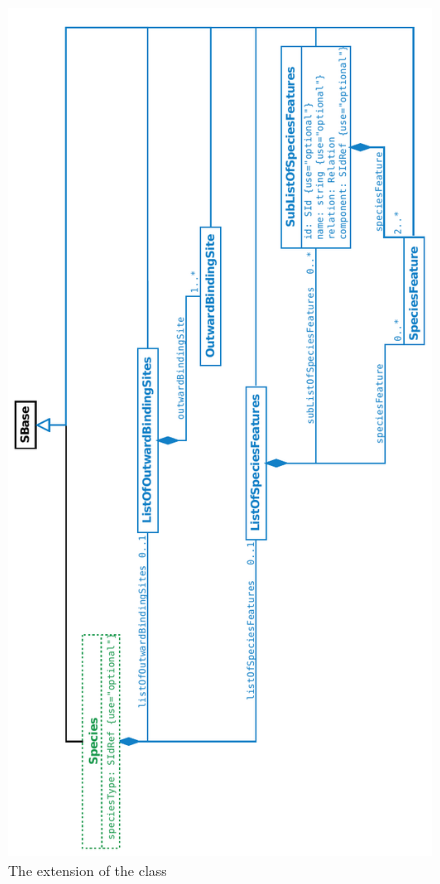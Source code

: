 \begin{figure}[htb]
  \begin{center}
    \includegraphics[angle=-90, scale=0.8]{./figs/multi_007_Species.pdf}
    \caption{The extension of the \ExSpecies class}
  \label{fig:ExSpecies}
  \end{center}
\end{figure}


